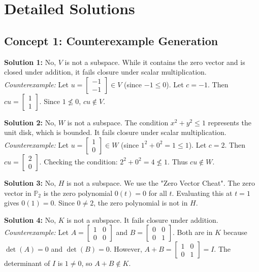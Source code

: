 \documentclass[11pt]{article}
\begin{document}
\newpage

\section{Detailed Solutions}

\subsection*{Concept 1: Counterexample Generation}

\textbf{Solution 1:}
No, $V$ is not a subspace. While it contains the zero vector and is closed under addition, it fails closure under scalar multiplication. 
\textit{Counterexample:} Let $u = \begin{bmatrix} -1 \\ -1 \end{bmatrix} \in V$ (since $-1 \le 0$). Let $c = -1$. Then $cu = \begin{bmatrix} 1 \\ 1 \end{bmatrix}$. Since $1 \not\le 0$, $cu \notin V$.

\vspace{0.3cm}
\textbf{Solution 2:}
No, $W$ is not a subspace. The condition $x^2+y^2 \le 1$ represents the unit disk, which is bounded. It fails closure under scalar multiplication.
\textit{Counterexample:} Let $u = \begin{bmatrix} 1 \\ 0 \end{bmatrix} \in W$ (since $1^2+0^2 = 1 \le 1$). Let $c = 2$. Then $cu = \begin{bmatrix} 2 \\ 0 \end{bmatrix}$. Checking the condition: $2^2 + 0^2 = 4 \not\le 1$. Thus $cu \notin W$.

\vspace{0.3cm}
\textbf{Solution 3:}
No, $H$ is not a subspace. We use the "Zero Vector Cheat". The zero vector in $\mathbb{P}_2$ is the zero polynomial $0(t) = 0$ for all $t$. Evaluating this at $t=1$ gives $0(1) = 0$. Since $0 \neq 2$, the zero polynomial is not in $H$.

\vspace{0.3cm}
\textbf{Solution 4:}
No, $K$ is not a subspace. It fails closure under addition.
\textit{Counterexample:} Let $A = \begin{bmatrix} 1 & 0 \\ 0 & 0 \end{bmatrix}$ and $B = \begin{bmatrix} 0 & 0 \\ 0 & 1 \end{bmatrix}$. Both are in $K$ because $\det(A) = 0$ and $\det(B) = 0$. However, $A+B = \begin{bmatrix} 1 & 0 \\ 0 & 1 \end{bmatrix} = I$. The determinant of $I$ is $1 \neq 0$, so $A+B \notin K$.
\end{document}
